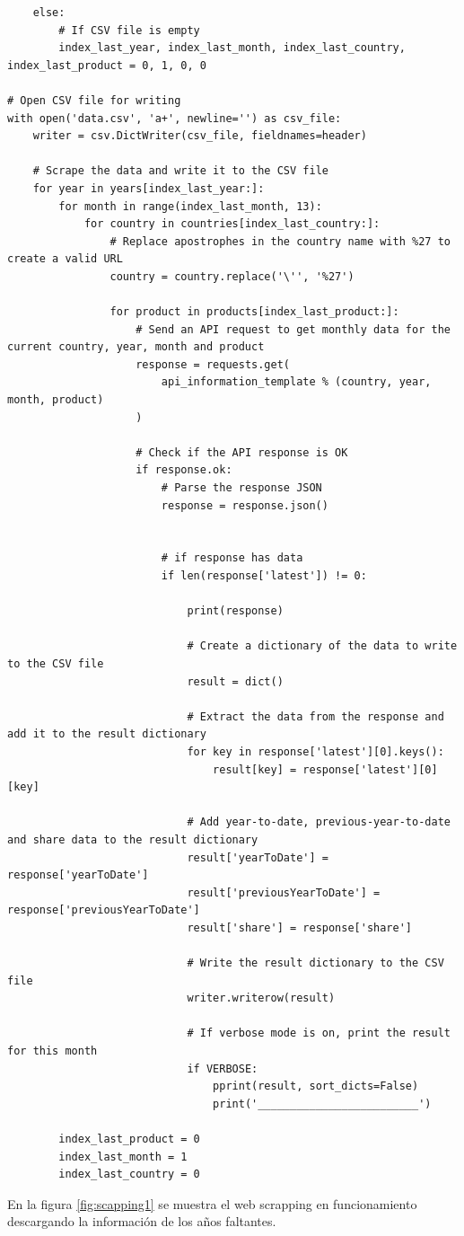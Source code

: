 \documentclass{article}
\begin{document}
\begin{verbatim}
	else:
		# If CSV file is empty 
		index_last_year, index_last_month, index_last_country, index_last_product = 0, 1, 0, 0

# Open CSV file for writing
with open('data.csv', 'a+', newline='') as csv_file:
	writer = csv.DictWriter(csv_file, fieldnames=header)

	# Scrape the data and write it to the CSV file
	for year in years[index_last_year:]:
		for month in range(index_last_month, 13):
			for country in countries[index_last_country:]:
				# Replace apostrophes in the country name with %27 to create a valid URL
				country = country.replace('\'', '%27')

				for product in products[index_last_product:]:
					# Send an API request to get monthly data for the current country, year, month and product
					response = requests.get(
						api_information_template % (country, year, month, product)
					)

					# Check if the API response is OK
					if response.ok:
						# Parse the response JSON
						response = response.json()


						# if response has data
						if len(response['latest']) != 0:

							print(response)

							# Create a dictionary of the data to write to the CSV file
							result = dict()

							# Extract the data from the response and add it to the result dictionary
							for key in response['latest'][0].keys():
								result[key] = response['latest'][0][key]

							# Add year-to-date, previous-year-to-date and share data to the result dictionary
							result['yearToDate'] = response['yearToDate']
							result['previousYearToDate'] = response['previousYearToDate']
							result['share'] = response['share']

							# Write the result dictionary to the CSV file
							writer.writerow(result)

							# If verbose mode is on, print the result for this month
							if VERBOSE:
								pprint(result, sort_dicts=False)
								print('_________________________')

		index_last_product = 0
		index_last_month = 1
		index_last_country = 0
\end{verbatim}

En la figura \ref{fig:scapping1} se muestra el web scrapping en funcionamiento descargando la informaci\'on de los a\~nos faltantes.
\end{document}
